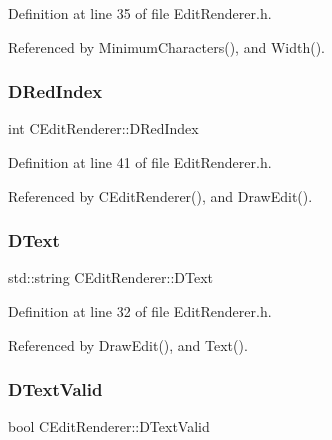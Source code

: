 Definition at line 35 of file Edit\+Renderer.\+h.



Referenced by Minimum\+Characters(), and Width().

\hypertarget{classCEditRenderer_a77ce4df48e03a8b9245f2045c2c3c4e7}{}\label{classCEditRenderer_a77ce4df48e03a8b9245f2045c2c3c4e7} 
\subsubsection{\texorpdfstring{D\+Red\+Index}{DRedIndex}}
{\footnotesize\ttfamily int C\+Edit\+Renderer\+::\+D\+Red\+Index\hspace{0.3cm}{\ttfamily [protected]}}



Definition at line 41 of file Edit\+Renderer.\+h.



Referenced by C\+Edit\+Renderer(), and Draw\+Edit().

\hypertarget{classCEditRenderer_af79bf047383c610d4fc24d937e29c594}{}\label{classCEditRenderer_af79bf047383c610d4fc24d937e29c594} 
\subsubsection{\texorpdfstring{D\+Text}{DText}}
{\footnotesize\ttfamily std\+::string C\+Edit\+Renderer\+::\+D\+Text\hspace{0.3cm}{\ttfamily [protected]}}



Definition at line 32 of file Edit\+Renderer.\+h.



Referenced by Draw\+Edit(), and Text().

\hypertarget{classCEditRenderer_ab4f0c6b356170adad1ad3b3e16573966}{}\label{classCEditRenderer_ab4f0c6b356170adad1ad3b3e16573966} 
\subsubsection{\texorpdfstring{D\+Text\+Valid}{DTextValid}}
{\footnotesize\ttfamily bool C\+Edit\+Renderer\+::\+D\+Text\+Valid\hspace{0.3cm}{\ttfamily [protected]}}



